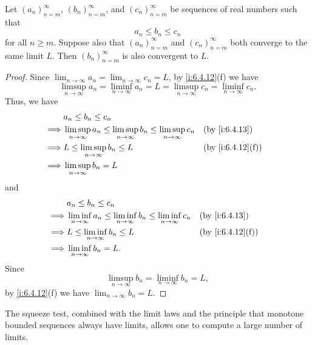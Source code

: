 \begin{cor}\label{i:6.4.14}
  Let \((a_n)_{n = m}^\infty\), \((b_n)_{n = m}^\infty\), and \((c_n)_{n = m}^\infty\) be sequences of real numbers such that
  \[
    a_n \leq b_n \leq c_n
  \]
  for all \(n \geq m\).
  Suppose also that \((a_n)_{n = m}^\infty\) and \((c_n)_{n = m}^\infty\) both converge to the same limit \(L\).
  Then \((b_n)_{n = m}^\infty\) is also convergent to \(L\).
\end{cor}

\begin{proof}
  Since \(\lim_{n \to \infty} a_n = \lim_{n \to \infty} c_n = L\), by \cref{i:6.4.12}(f) we have
  \[
    \limsup_{n \to \infty} a_n = \liminf_{n \to \infty} a_n = L = \limsup_{n \to \infty} c_n = \liminf_{n \to \infty} c_n.
  \]
  Thus, we have
  \begin{align*}
             & a_n \leq b_n \leq c_n                                                                                            \\
    \implies & \limsup_{n \to \infty} a_n \leq \limsup_{n \to \infty} b_n \leq \limsup_{n \to \infty} c_n &  & \by{i:6.4.13}    \\
    \implies & L \leq \limsup_{n \to \infty} b_n \leq L                                                   &  & \by{i:6.4.12}[f] \\
    \implies & \limsup_{n \to \infty} b_n = L
  \end{align*}
  and
  \begin{align*}
             & a_n \leq b_n \leq c_n                                                                                            \\
    \implies & \liminf_{n \to \infty} a_n \leq \liminf_{n \to \infty} b_n \leq \liminf_{n \to \infty} c_n &  & \by{i:6.4.13}    \\
    \implies & L \leq \liminf_{n \to \infty} b_n \leq L                                                   &  & \by{i:6.4.12}[f] \\
    \implies & \liminf_{n \to \infty} b_n = L.
  \end{align*}
  Since
  \[
    \limsup_{n \to \infty} b_n = \liminf_{n \to \infty} b_n = L,
  \]
  by \cref{i:6.4.12}(f) we have \(\lim_{n \to \infty} b_n = L\).
\end{proof}

\setcounter{thm}{15}
\begin{rmk}\label{i:6.4.16}
  The squeeze test, combined with the limit laws and the principle that monotone bounded sequences always have limits, allows one to compute a large number of limits.
\end{rmk}

